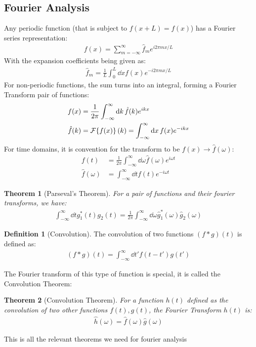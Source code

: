 \documentclass[12pt]{article}
\theoremstyle{plain}
\newtheorem{theorem}{Theorem}[section]
\theoremstyle{definition}
\newtheorem{definition}{Definition}[section]
\begin{document}
\subsection{Fourier Analysis}
Any periodic function (that is subject to $f(x+L)=f(x)$) has a Fourier series representation:
\begin{align*}
  f(x)=\sum_{m=-\infty}^\infty\hat{f}_me^{i2\pi mx/L}
\end{align*}
With the expansion coefficients being given as:
\begin{align*}
  \hat{f}_m=\frac1L\int_0^L\dd{x}f(x)e^{-i2\pi mx/L}
\end{align*}
For non-periodic functions, the sum turns into an integral, forming a Fourier Transform pair of functions:
\begin{align*}
  f(x)&=\frac1{2\pi}\int_{-\infty}^\infty\dd{k}\hat{f}(k)e^{ikx}\\
  \hat{f}(k)&=\mathcal{F}\qty{f(x)}(k)=\int_{-\infty}^\infty\dd{x}f(x)e^{-ikx}
\end{align*}
For time domains, it is convention for the transform to be $f(x)\to\hat{f}(\omega)$:
\begin{align*}
  f(t)&=\frac1{2\pi}\int_{-\infty}^\infty\dd{\omega}\hat{f}(\omega)e^{i\omega t}\\
  \hat{f}(\omega)&=\int_{-\infty}^\infty\dd{t}f(t)e^{-i\omega t}
\end{align*}
\begin{theorem}[Parseval's Theorem]
  For a pair of functions and their fourier transforms, we have:
  \begin{align*}
    \int_{-\infty}^\infty\dd{t}g_1^*(t)g_2(t)=
    \frac1{2\pi}\int_{-\infty}^\infty\dd{\omega}
    \hat{g}_1^*(\omega)\hat{g}_2(\omega)
  \end{align*}
\end{theorem}
\begin{definition}[Convolution]
  The convolution of two functions $(f*g)(t)$ is defined as:
  \begin{align*}
    (f*g)(t)=\int_{-\infty}^\infty\dd{t'}f(t-t')g(t')
  \end{align*}
\end{definition}
The Fourier transform of this type of function is special, it is called the Convolution Theorem:
\begin{theorem}[Convolution Theorem]
  For a function $h(t)$ defined as the convolution of two other functions $f(t),g(t)$, the Fourier Transform $h(t)$ is:
  \begin{align*}
    \hat{h}(\omega)=\hat{f}(\omega)\hat{g}(\omega)
  \end{align*}
\end{theorem}
This is all the relevant theorems we need for fourier analysis
\end{document}
